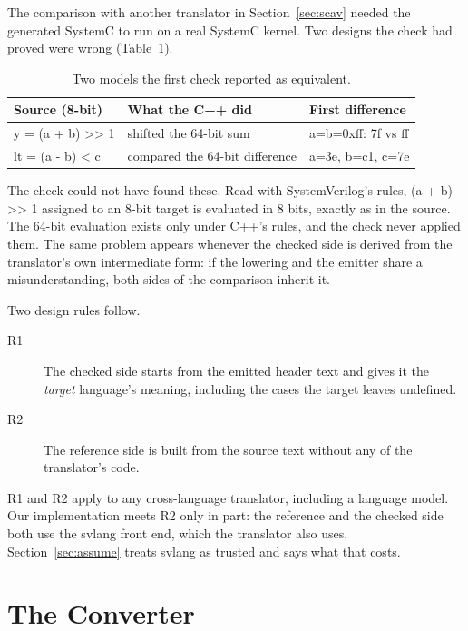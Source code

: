 \documentclass[conference]{IEEEtran}
\newcommand{\code}[1]{{\fontshape{n}\ttfamily #1}}
\begin{document}
The comparison with another translator in Section~\ref{sec:scav} needed the generated SystemC to
run on a real SystemC kernel. Two designs the check had proved were wrong
(Table~\ref{tab:fooled}).

\begin{table}[h]
\centering
\caption{Two models the first check reported as equivalent.}
\label{tab:fooled}
\footnotesize
\setlength{\tabcolsep}{3pt}
\begin{tabularx}{\columnwidth}{@{}l >{\raggedright\arraybackslash}X l@{}}
\toprule
Source (8-bit) & What the C++ did & First difference \\
\midrule
\code{y = (a + b) >> 1} & shifted the 64-bit sum & \code{a=b=0xff}: \code{7f} vs \code{ff} \\
\code{lt = (a - b) < c} & compared the 64-bit difference & \code{a=3e, b=c1, c=7e} \\
\bottomrule
\end{tabularx}
\end{table}

The check could not have found these. Read with SystemVerilog's rules, \code{(a + b) >> 1}
assigned to an 8-bit target is evaluated in 8 bits, exactly as in the source. The 64-bit
evaluation exists only under C++'s rules, and the check never applied them. The same problem
appears whenever the checked side is derived from the translator's own intermediate form: if the
lowering and the emitter share a misunderstanding, both sides of the comparison inherit it.

Two design rules follow.
\begin{description}
\item[R1] The checked side starts from the emitted header text and gives it the \emph{target}
language's meaning, including the cases the target leaves undefined.
\item[R2] The reference side is built from the source text without any of the translator's code.
\end{description}
R1 and R2 apply to any cross-language translator, including a language model. Our implementation
meets R2 only in part: the reference and the checked side both use the \code{svlang} front end,
which the translator also uses. Section~\ref{sec:assume} treats \code{svlang} as trusted and says
what that costs.

\section{The Converter}
\label{sec:convert}
\end{document}
